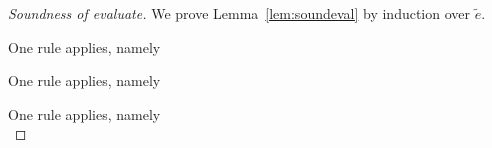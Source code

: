 \begin{proof}[Soundness of evaluate]

  We prove Lemma~\ref{lem:soundeval} by induction over $\tilde{e}$.

    {One rule applies, namely 
    }

    {One rule applies, namely \\
    }

  {
    One rule applies, namely \\
    }


\end{proof}
